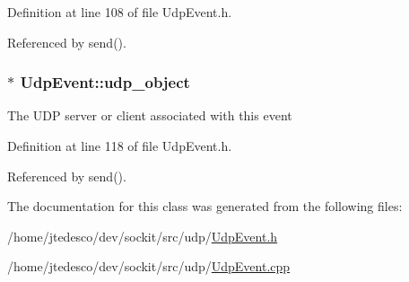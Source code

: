 Definition at line 108 of file UdpEvent.h.



Referenced by send().

\hypertarget{classUdpEvent_a36790f09da79074fc7506dfb3fad7013}{
\subsubsection[{udp\_\-object}]{$\ast$ {\bf UdpEvent::udp\_\-object}}}
\label{classUdpEvent_a36790f09da79074fc7506dfb3fad7013}
The UDP server or client associated with this event 

Definition at line 118 of file UdpEvent.h.



Referenced by send().



The documentation for this class was generated from the following files:\begin{DoxyCompactItemize}
\item 
/home/jtedesco/dev/sockit/src/udp/\hyperlink{UdpEvent_8h}{UdpEvent.h}\item 
/home/jtedesco/dev/sockit/src/udp/\hyperlink{UdpEvent_8cpp}{UdpEvent.cpp}\end{DoxyCompactItemize}
